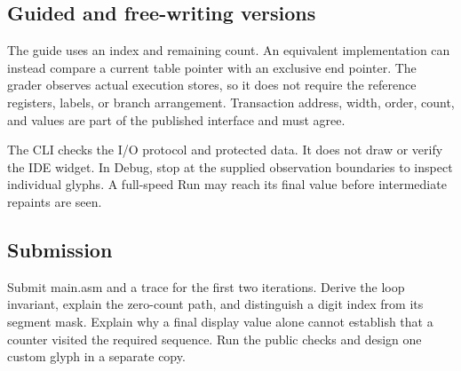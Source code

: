 \subsection{Guided and free-writing
  versions}\label{005-seven-segment-counter-assignment-guided-and-free-writing-versions}

The guide uses an index and remaining count. An equivalent
implementation can instead compare a current table pointer with an
exclusive end pointer. The grader observes actual execution stores, so
it does not require the reference registers, labels, or branch
arrangement. Transaction address, width, order, count, and values are
part of the published interface and must agree.

The CLI checks the I/O protocol and protected data. It does not draw or
verify the IDE widget. In Debug, stop at the supplied observation
boundaries to inspect individual glyphs. A full-speed Run may reach its
final value before intermediate repaints are seen.

\subsection{Submission}\label{005-seven-segment-counter-assignment-submission}

Submit main.asm and a trace for the first two iterations. Derive the
loop invariant, explain the zero-count path, and distinguish a digit
index from its segment mask. Explain why a final display value alone
cannot establish that a counter visited the required sequence. Run the
public checks and design one custom glyph in a separate copy.
